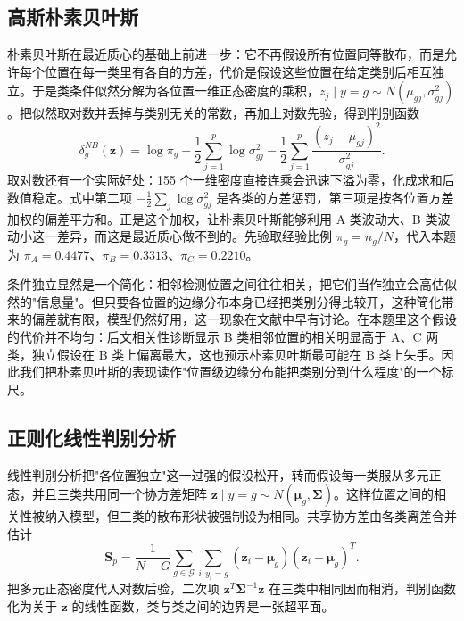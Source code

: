 \documentclass[12pt,a4paper]{article}
\newcommand{\upcite}[1]{\cite{#1}}
\begin{document}
\subsection{高斯朴素贝叶斯}

朴素贝叶斯在最近质心的基础上前进一步：它不再假设所有位置同等散布，而是允许每个位置在每一类里有各自的方差，代价是假设这些位置在给定类别后相互独立。于是类条件似然分解为各位置一维正态密度的乘积，$z_j\mid y=g\sim N(\mu_{gj},\sigma_{gj}^2)$。把似然取对数并丢掉与类别无关的常数，再加上对数先验，得到判别函数
\begin{equation}
\delta_g^{NB}(\mathbf{z})=\log\pi_g-\frac{1}{2}\sum_{j=1}^{p}\log\sigma_{gj}^2
-\frac{1}{2}\sum_{j=1}^{p}\frac{(z_j-\mu_{gj})^2}{\sigma_{gj}^2}.
\end{equation}
取对数还有一个实际好处：155 个一维密度直接连乘会迅速下溢为零，化成求和后数值稳定。式中第二项 $-\frac{1}{2}\sum_j\log\sigma_{gj}^2$ 是各类的方差惩罚，第三项是按各位置方差加权的偏差平方和。正是这个加权，让朴素贝叶斯能够利用 A 类波动大、B 类波动小这一差异，而这是最近质心做不到的。先验取经验比例 $\pi_g=n_g/N$，代入本题为 $\pi_A=0.4477$、$\pi_B=0.3313$、$\pi_C=0.2210$。

条件独立显然是一个简化：相邻检测位置之间往往相关，把它们当作独立会高估似然的"信息量"。但只要各位置的边缘分布本身已经把类别分得比较开，这种简化带来的偏差就有限，模型仍然好用，这一现象在文献中早有讨论\upcite{handyu2001}。在本题里这个假设的代价并不均匀：后文相关性诊断显示 B 类相邻位置的相关明显高于 A、C 两类，独立假设在 B 类上偏离最大，这也预示朴素贝叶斯最可能在 B 类上失手。因此我们把朴素贝叶斯的表现读作"位置级边缘分布能把类别分到什么程度"的一个标尺。

\subsection{正则化线性判别分析}

线性判别分析把"各位置独立"这一过强的假设松开，转而假设每一类服从多元正态，并且三类共用同一个协方差矩阵 $\mathbf{z}\mid y=g\sim N(\boldsymbol{\mu}_g,\boldsymbol{\Sigma})$。这样位置之间的相关性被纳入模型，但三类的散布形状被强制设为相同。共享协方差由各类离差合并估计
\begin{equation}
\mathbf{S}_p=\frac{1}{N-G}\sum_{g\in\mathcal{G}}\sum_{i:y_i=g}(\mathbf{z}_i-\boldsymbol{\mu}_g)(\mathbf{z}_i-\boldsymbol{\mu}_g)^{T}.
\end{equation}
把多元正态密度代入对数后验，二次项 $\mathbf{z}^T\boldsymbol{\Sigma}^{-1}\mathbf{z}$ 在三类中相同因而相消，判别函数化为关于 $\mathbf{z}$ 的线性函数，类与类之间的边界是一张超平面。
\end{document}
